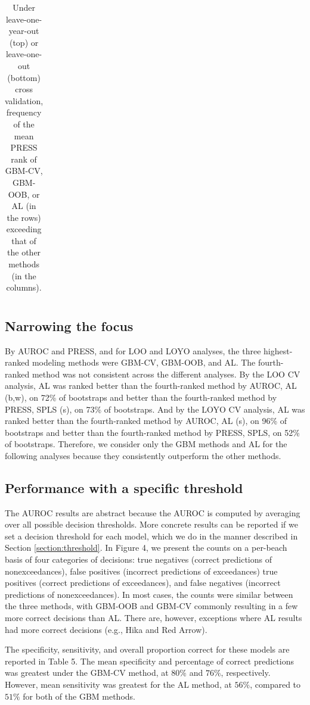 \documentclass[authoryear,review, 12pt]{elsarticle}
\begin{document}
\begin{table}
\begin{tabular}{rccccccc}
    \end{tabular}
    \caption{Under leave-one-year-out (top) or leave-one-out (bottom) cross validation, frequency of the mean PRESS rank of GBM-CV, GBM-OOB, or AL (in the rows) exceeding that of the other methods (in the columns).}
    \label{table:press.pairs.annual}
\end{table}

\subsection{Narrowing the focus}\label{narrowing-the-focus}

By AUROC and PRESS, and for LOO and LOYO analyses, the three
highest-ranked modeling methods were GBM-CV, GBM-OOB, and AL. The
fourth-ranked method was not consistent across the different analyses.
By the LOO CV analysis, AL was ranked better than the fourth-ranked
method by AUROC, AL (b,w), on 72\% of bootstraps and better than the
fourth-ranked method by PRESS, SPLS (s), on 73\% of bootstraps. And by
the LOYO CV analysis, AL was ranked better than the fourth-ranked method
by AUROC, AL (s), on 96\% of bootstraps and better than the
fourth-ranked method by PRESS, SPLS, on 52\% of bootstraps. Therefore,
we consider only the GBM methods and AL for the following analyses
because they consistently outperform the other methods.

\subsection{Performance with a specific threshold}
The AUROC results are abstract because the AUROC is computed by averaging over all possible decision thresholds. More concrete results can be reported if we set a decision threshold for each model, which we do in the manner described in Section \ref{section:threshold}. In Figure 4, we present the counts on a per-beach basis of four
categories of decisions: true negatives (correct predictions of
nonexceedances), false positives (incorrect predictions of exceedances)
true positives (correct predictions of exceedances), and false negatives
(incorrect predictions of nonexceedances). In most cases, the counts
were similar between the three methods, with GBM-OOB and GBM-CV
commonly resulting in a few more correct decisions than AL. There are,
however, exceptions where AL results had more correct decisions (e.g.,
Hika and Red Arrow).

The specificity, sensitivity, and overall proportion correct for these models are reported in Table 5. The mean specificity and percentage of correct predictions was greatest under the GBM-CV method, at \(80\%\) and \(76\%\), respectively. However, mean sensitivity was greatest for the AL method, at \(56\%\), compared to \(51\%\) for both of the GBM methods.
\end{document}
